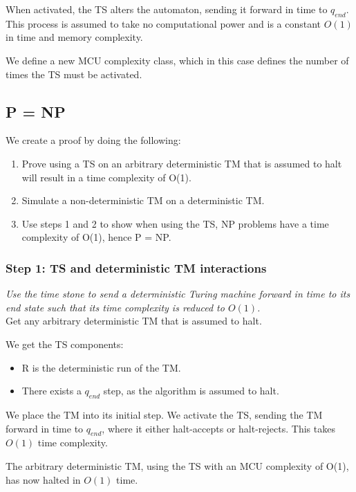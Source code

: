 \documentclass{report}
\begin{document}
When activated, the TS alters the automaton, sending it forward in time to $q_{end}$. This process is assumed to take no computational power and is a constant $O(1)$ in time and memory complexity.

We define a new MCU complexity class, which in this case defines the number of times the TS must be activated.

\subsection{P = NP}

We create a proof by doing the following:

\begin{enumerate}
  \item Prove using a TS on an arbitrary deterministic TM that is assumed to halt will result in a time complexity of O(1).
  \item Simulate a non-deterministic TM on a deterministic TM.
  \item Use steps 1 and 2 to show when using the TS, NP problems have a time complexity of O(1), hence P = NP.
\end{enumerate}

\subsubsection{Step 1: TS and deterministic TM interactions}

\textit{Use the time stone to send a deterministic Turing machine forward in time to its end state such that its time complexity is reduced to $O(1)$.}\\

Get any arbitrary deterministic TM that is assumed to halt.

We get the TS components:

\begin{itemize}
  \item R is the deterministic run of the TM.
  \item There exists a $q_{end}$ step, as the algorithm is assumed to halt.
\end{itemize}

We place the TM into its initial step. We activate the TS, sending the TM forward in time to $q_{end}$, where it either halt-accepts or halt-rejects. This takes $O(1)$ time complexity.

The arbitrary deterministic TM, using the TS with an MCU complexity of O(1), has now halted in $O(1)$ time.
\end{document}
